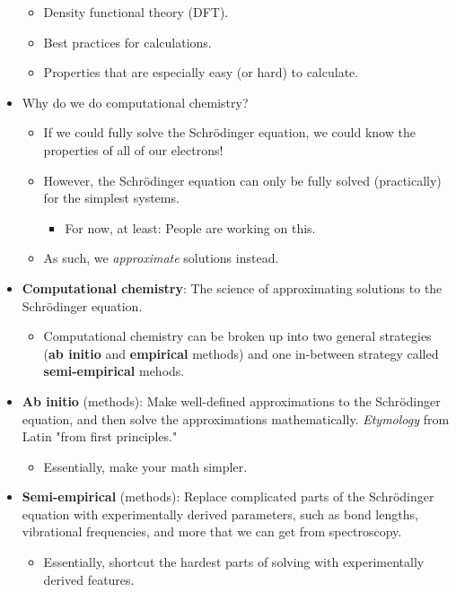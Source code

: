 \documentclass[../notes.tex]{subfiles}
\begin{document}
\begin{itemize}
\begin{itemize}
        \item Density functional theory (DFT).
        \item Best practices for calculations.
        \item Properties that are especially easy (or hard) to calculate.
    \end{itemize}
    \item Why do we do computational chemistry?
    \begin{itemize}
        \item If we could fully solve the Schr\"{o}dinger equation, we could know the properties of all of our electrons!
        \item However, the Schr\"{o}dinger equation can only be fully solved (practically) for the simplest systems.
        \begin{itemize}
            \item For now, at least: People are working on this.
        \end{itemize}
        \item As such, we \emph{approximate} solutions instead.
    \end{itemize}
    \pagebreak
    \item \textbf{Computational chemistry}: The science of approximating solutions to the Schr\"{o}dinger equation.
    \begin{itemize}
        \item Computational chemistry can be broken up into two general strategies (\textbf{ab initio} and \textbf{empirical} methods) and one in-between strategy called \textbf{semi-empirical} mehods.
    \end{itemize}
    \item \textbf{Ab initio} (methods): Make well-defined approximations to the Schr\"{o}dinger equation, and then solve the approximations mathematically. \emph{Etymology} from Latin "from first principles."
    \begin{itemize}
        \item Essentially, make your math simpler.
    \end{itemize}
    \item \textbf{Semi-empirical} (methods): Replace complicated parts of the Schr\"{o}dinger equation with experimentally derived parameters, such as bond lengths, vibrational frequencies, and more that we can get from spectroscopy.
    \begin{itemize}
        \item Essentially, shortcut the hardest parts of solving with experimentally derived features.

\end{itemize}
\end{itemize}
\end{document}
